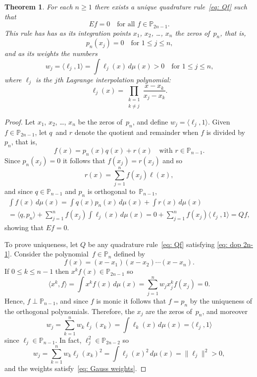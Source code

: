 \documentclass[12pt,a4paper]{article}
\newtheorem{theorem}{Theorem}
\newcommand{\iprod}[1]{\langle#1\rangle}
\newcommand{\Poly}{\mathbb{P}}
\begin{document}
\begin{theorem}\label{thm: Gauss rule}
For each $n\ge1$ there exists a unique quadrature rule~\eqref{eq: Qf}
such that
\begin{equation}\label{eq: dop 2n-1}
Ef=0\quad\text{for all $f\in\Poly_{2n-1}$.}
\end{equation}
This rule has has as its integration points $x_1$, $x_2$, \dots, 
$x_n$ the zeros of~$p_n$, that is,
\[
p_n(x_j)=0\quad\text{for $1\le j\le n$,}
\]
and as its weights the numbers
\begin{equation}\label{eq: Gauss weights}
w_j=\iprod{\ell_j,1}=\int\ell_j(x)\,d\mu(x)>0
	\quad\text{for $1\le j\le n$,}
\end{equation}
where $\ell_j$ is the $j$th Lagrange interpolation polynomial:
\[
\ell_j(x)=\prod_{\substack{k=1\\ k\ne j}}\frac{x-x_k}{x_j-x_k}.
\]
\end{theorem}
\begin{proof}
Let $x_1$, $x_2$, \dots, $x_n$ be the zeros of~$p_n$, and define
$w_j=\iprod{\ell_j,1}$.  Given $f\in\Poly_{2n-1}$, let $q$~and $r$ 
denote the quotient and remainder when $f$ is divided by~$p_n$, that 
is,
\[
f(x)=p_n(x)q(x)+r(x)\quad\text{with $r\in\Poly_{n-1}$.}
\]
Since $p_n(x_j)=0$ it follows that $f(x_j)=r(x_j)$ and so
\[
r(x)=\sum_{j=1}^n f(x_j)\ell(x),
\]
and since $q\in\Poly_{n-1}$ and $p_n$ is orthogonal to~$\Poly_{n-1}$,
\begin{multline*}
\int f(x)\,d\mu(x)=\int q(x)p_n(x)\,d\mu(x)+\int r(x)\,d\mu(x)\\
	=\iprod{q,p_n}+\sum_{j=1}^n f(x_j)\int\ell_j(x)\,d\mu(x)
	=0+\sum_{j=1}^n f(x_j)\iprod{\ell_j,1}=Qf,
\end{multline*}
showing that $Ef=0$.  

To prove uniqueness, let $Q$ be any quadrature rule~\eqref{eq: Qf} 
satisfying \eqref{eq: dop 2n-1}.  Consider the 
polynomial~$f\in\Poly_n$ defined by
\[
f(x)=(x-x_1)(x-x_2)\cdots(x-x_n).
\]
If $0\le k\le n-1$ then $x^kf(x)\in\Poly_{2n-1}$ so
\[
\iprod{x^k,f}=\int x^kf(x)\,d\mu(x)=\sum_{j=1}^n w_jx_j^kf(x_j)=0.
\]
Hence, $f\perp\Poly_{n-1}$, and since $f$ is monic it follows that 
$f=p_n$ by the uniqueness of the orthogonal polynomials.  Therefore,
the $x_j$ are the zeros of~$p_n$, and moreover
\[
w_j=\sum_{k=1}^nw_k\ell_j(x_k)=\int\ell_k(x)\,d\mu(x)=\iprod{\ell_j,1}
\]
since $\ell_j\in\Poly_{n-1}$.  In fact, $\ell_j^2\in\Poly_{2n-2}$ so
\[
w_j=\sum_{k=1}^nw_k\ell_j(x_k)^2=\int\ell_j(x)^2\,d\mu(x)
	=\|\ell_j\|^2>0,
\]
and the weights satisfy~\eqref{eq: Gauss weights}.
\end{proof}
\end{document}
